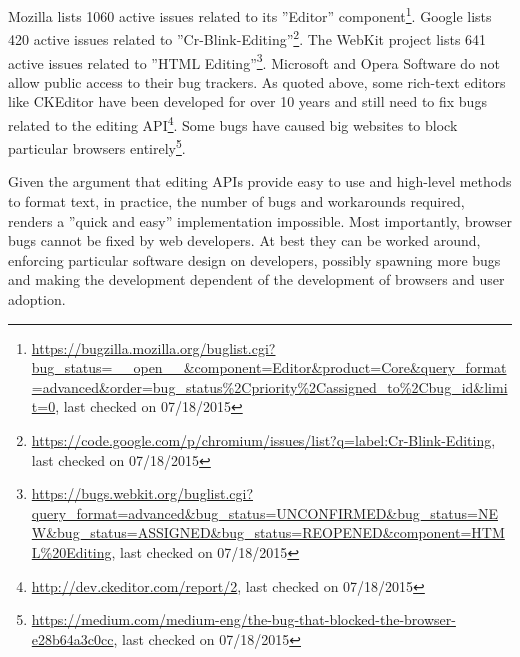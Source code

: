 \noindent Mozilla lists 1060 active issues related to its ''Editor'' component\footnote{\url{https://bugzilla.mozilla.org/buglist.cgi?bug\_status=\_\_open\_\_\&component=Editor\&product=Core\&query\_format=advanced\&order=bug\_status\%2Cpriority\%2Cassigned\_to\%2Cbug\_id\&limit=0}, last checked on 07/18/2015}. Google lists 420 active issues related to ''Cr-Blink-Editing''\footnote{\url{https://code.google.com/p/chromium/issues/list?q=label:Cr-Blink-Editing}, last checked on 07/18/2015}. The WebKit project lists 641 active issues related to ''HTML Editing''\footnote{\url{https://bugs.webkit.org/buglist.cgi?query\_format=advanced\&bug\_status=UNCONFIRMED\&bug\_status=NEW\&bug\_status=ASSIGNED\&bug\_status=REOPENED\&component=HTML\%20Editing}, last checked on 07/18/2015}. Microsoft and Opera Software do not allow public access to their bug trackers. As quoted above, some rich-text editors like CKEditor have been developed for over 10 years and still need to fix bugs related to the editing API\footnote{\url{http://dev.ckeditor.com/report/2}, last checked on 07/18/2015}\cite{sopp}. Some bugs have caused big websites to block particular browsers entirely\footnote{\url{https://medium.com/medium-eng/the-bug-that-blocked-the-browser-e28b64a3c0cc}, last checked on 07/18/2015}. %

%
%

Given the argument that editing APIs provide easy to use and high-level methods to format text, in practice, the number of bugs and workarounds required, renders a ''quick and easy'' implementation impossible. Most importantly, browser bugs cannot be fixed by web developers. At best they can be worked around, enforcing particular software design on developers, possibly spawning more bugs and making the development dependent of the development of browsers and user adoption.